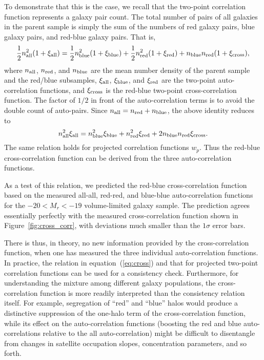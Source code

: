 \documentclass[]{emulateapj}
\begin{document}
To demonstrate that this is the case, we recall that the two-point 
correlation function represents a galaxy pair count. The total number of pairs 
of all galaxies in the parent sample is simply the sum of the numbers of red 
galaxy pairs, blue galaxy pairs, and red-blue galaxy pairs. That is,
\begin{equation}
         \frac{1}{2}n_{\rm all}^2  (1+\xi_{\rm all}) =  
         \frac{1}{2}n_{\rm blue}^2 (1+\xi_{\rm blue}) 
       + \frac{1}{2}n_{\rm red}^2  (1+\xi_{\rm red}) 
       + n_{\rm blue} n_{\rm red}  (1+\xi_{\rm cross}),
\end{equation}
where $n_{\rm all}$, $n_{\rm red}$, and $n_{\rm blue}$ are the mean number 
density of the parent sample and the red/blue subsamples, $\xi_{\rm all}$,
$\xi_{\rm blue}$, and $\xi_{\rm red}$ are the two-point auto-correlation 
functions, and $\xi_{\rm cross}$ is the red-blue two-point cross-correlation
function. The factor of $1/2$ in front of the auto-correlation terms is to
avoid the double count of auto-pairs. Since $n_{\rm all}=n_{\rm red}
+n_{\rm blue}$, 
the above identity reduces to
\begin{equation}
\label{eq:cross}
        n_{\rm all}^2 \xi_{\rm all} = 
                n_{\rm blue}^2 \xi_{\rm blue} 
              + n_{\rm red}^2 \xi_{\rm red} 
              + 2 n_{\rm blue} n_{\rm red} \xi_{\rm cross}.
\end{equation}
The same relation holds for projected correlation functions $w_p$. 
Thus the red-blue cross-correlation function
can be derived from the three auto-correlation functions.

As a test of this relation, we predicted the red-blue cross-correlation
function based on the measured all-all, red-red, and blue-blue auto-correlation
functions for the $-20<M_r<-19$ volume-limited galaxy sample. 
The prediction agrees essentially perfectly with the measured
cross-correlation function shown in Figure~\ref{fig:cross_corr},
with deviations much smaller than the $1\sigma$ error bars.

There is thus, in theory, no new information provided by the
cross-correlation function, when one has measured the three individual
auto-correlation functions. In practice, the relation in 
equation~(\ref{eq:cross}) and that for projected two-point correlation
functions can be used for a consistency check.
Furthermore, for understanding the mixture among different galaxy
populations, the cross-correlation function is more readily
interpreted than the consistency relation itself.
For example, segregation of ``red'' and ``blue'' halos would produce
a distinctive suppression of the one-halo term of the cross-correlation
function, while its effect on the auto-correlation functions (boosting
the red and blue auto-correlations relative to the all auto-correlation)
might be difficult to disentangle from changes in satellite 
occupation slopes, concentration parameters, and so forth.
\end{document}
